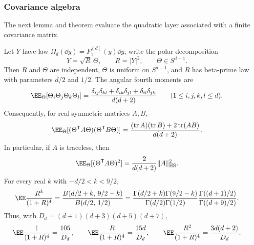 

\subsubsection*{Covariance algebra}\leavevmode\par\smallskip

The next lemma and theorem evaluate the quadratic layer associated with a
finite covariance matrix.

\begin{lemma}%
\label{lem:radial-angular-contractions}
Let \(Y\) have law
\(\Omega_d(\dd y)=P_1^{(d)}(y)\dd y\), write the polar decomposition
\[
Y=\sqrt R\,\Theta,\qquad R=|Y|^2,\qquad \Theta\in S^{d-1}.
\]
Then \(R\) and \(\Theta\) are independent, \(\Theta\) is uniform on
\(S^{d-1}\), and \(R\) has beta-prime law with parameters \(d/2\) and
\(1/2\).  The angular fourth moments are
\begin{equation}\label{eq:spherical-fourth-contraction}
\EE_\Theta[\Theta_i\Theta_j\Theta_k\Theta_l]
=
\frac{\delta_{ij}\delta_{kl}
+\delta_{ik}\delta_{jl}
+\delta_{il}\delta_{jk}}{d(d+2)}
\qquad(1\le i,j,k,l\le d).
\end{equation}
Consequently, for real symmetric matrices \(A,B\),
\begin{equation}\label{eq:spherical-quadratic-contraction}
\EE_\Theta[
(\Theta^{\mathsf T}A\Theta)(\Theta^{\mathsf T}B\Theta)]
=
\frac{(\operatorname{tr}A)(\operatorname{tr}B)
+2\operatorname{tr}(AB)}{d(d+2)}.
\end{equation}
In particular, if \(A\) is traceless, then
\begin{equation}\label{eq:spherical-traceless-square}
\EE_\Theta[(\Theta^{\mathsf T}A\Theta)^2]
=\frac{2}{d(d+2)}\|A\|_{\rm HS}^2 .
\end{equation}
For every real \(k\) with \(-d/2<k<9/2\),
\begin{equation}\label{eq:radial-beta-prime-contraction-general}
\EE\frac{R^k}{(1+R)^4}
=
\frac{B(d/2+k,\,9/2-k)}{B(d/2,\,1/2)}
=
\frac{\Gamma(d/2+k)\Gamma(9/2-k)}
{\Gamma(d/2)\Gamma(1/2)}
\frac{\Gamma((d+1)/2)}{\Gamma((d+9)/2)} .
\end{equation}
Thus, with \(D_d=(d+1)(d+3)(d+5)(d+7)\),
\begin{equation}\label{eq:radial-beta-prime-contractions-low}
\EE\frac{1}{(1+R)^4}=\frac{105}{D_d},\qquad
\EE\frac{R}{(1+R)^4}=\frac{15d}{D_d},\qquad
\EE\frac{R^2}{(1+R)^4}=\frac{3d(d+2)}{D_d}.
\end{equation}
\end{lemma}

